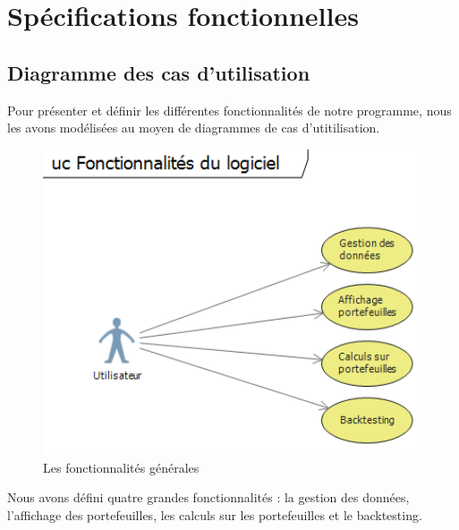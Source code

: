 \documentclass[a4paper]{report}
\begin{document}
\chapter{Spécifications fonctionnelles}

\section{Diagramme des cas d'utilisation}

Pour présenter et définir les différentes fonctionnalités de notre programme, nous les avons modélisées au moyen de diagrammes de cas d'utitilisation.

\begin{figure}[H]
  \center
  \includegraphics[width=1\textwidth]{General.png}
  \caption{Les fonctionnalités générales}
\end{figure} 

Nous avons défini quatre grandes fonctionnalités : la gestion des données, l'affichage des portefeuilles, les calculs sur les portefeuilles et le backtesting.
\end{document}

